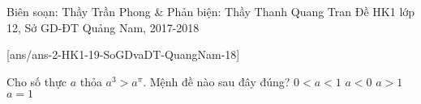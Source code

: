 \begin{name}
{Biên soạn: Thầy Trần Phong \& Phản biện: Thầy Thanh Quang Tran}
{Đề HK1 lớp 12, Sở GD-ĐT Quảng Nam, 2017-2018}
\end{name}

\setcounter{ex}{0}\setcounter{bt}{0}
[ans/ans-2-HK1-19-SoGDvaDT-QuangNam-18]

\begin{ex}%
Cho số thực $a$ thỏa $a^3>a^{\pi}$. Mệnh đề nào sau đây đúng?
\choice
{\True $0<a<1$}
{$a<0$}
{$a>1$}
{$a=1$}
\end{ex}

